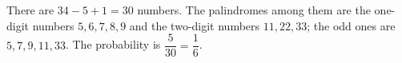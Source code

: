 There are $34-5+1=30$ numbers. The palindromes among them are the one-digit numbers $5,6,7,8,9$ and the two-digit numbers $11,22,33$; the odd ones are $5,7,9,11,33$. The probability is $\dfrac{5}{30}=\boxed{\dfrac16}$.
